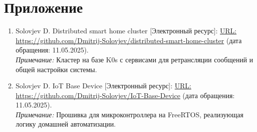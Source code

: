 \documentclass[14pt, a4paper]{extreport}
\begin{document}
\newpage

\chapter{Приложение}

\begin{enumerate}[label=\arabic*.]
  \item Solovjev D. Distributed smart home cluster  [Электронный ресурс]: 
        \url{URL: https://github.com/Dmitrij-Solovjev/distributed-smart-home-cluster}
        (дата обращения: 11.05.2025). \\
        \emph{Примечание:} Кластер на базе K0s с сервисами для ретрансляции сообщений и общей настройки системы.
        
  \item Solovjev D. IoT Base Device [Электронный ресурс]: 
        \url{URL: https://github.com/Dmitrij-Solovjev/IoT-Base-Device} 
        (дата обращения: 11.05.2025). \\
        \emph{Примечание:} Прошивка для микроконтроллера на FreeRTOS, реализующая логику домашней автоматизации.
\end{enumerate}
\end{document}
